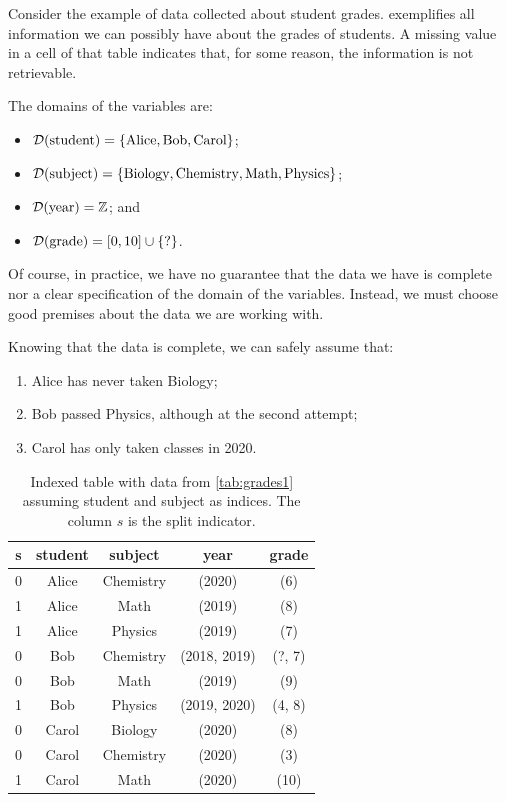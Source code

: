 Consider the example of data collected about student grades.  
exemplifies all information we can possibly have about the grades of students.  A missing
value in a cell of that table indicates that, for some reason, the information is not
retrievable.

The domains of the variables are:
\begin{itemize}
  \itemsep0em
  \item $\mathcal{D}\!\left(\text{student}\right) = \left\{\text{Alice}, \text{Bob}, \text{Carol}\right\}$;
  \item $\mathcal{D}\!\left(\text{subject}\right) = \left\{\text{Biology}, \text{Chemistry}, \text{Math},
    \text{Physics}\right\}$;
  \item $\mathcal{D}\!\left(\text{year}\right) = \mathbb{Z}$; and
  \item $\mathcal{D}\!\left(\text{grade}\right) = \left[0, 10\right] \cup \left\{\text{?}\right\}$.
\end{itemize}

Of course, in practice, we have no guarantee that the data we have is complete nor a
clear specification of the domain of the variables.  Instead, we must choose good
premises about the data we are working with.

Knowing that the data is complete, we can safely assume that:
\begin{enumerate}
  \itemsep0em
  \item Alice has never taken Biology;
  \item Bob passed Physics, although at the second attempt;
  \item Carol has only taken classes in 2020.
\end{enumerate}

\begin{table}
  \centering
  \begin{tabular}{ccccc}
    \toprule
    \textbf{s} & \textbf{student} & \textbf{subject} & \textbf{year} & \textbf{grade} \\
    \midrule
    0 & Alice & Chemistry & (2020) & (6) \\
    1 & Alice & Math & (2019) & (8) \\
    1 & Alice & Physics & (2019) & (7) \\
    0 & Bob & Chemistry & (2018, 2019) & (?, 7) \\
    0 & Bob & Math & (2019) & (9) \\
    1 & Bob & Physics & (2019, 2020) & (4, 8) \\
    0 & Carol & Biology & (2020) & (8) \\
    0 & Carol & Chemistry & (2020) & (3) \\
    1 & Carol & Math & (2020) & (10) \\
    \bottomrule
  \end{tabular}
  \caption{
  Indexed table with data from \cref{tab:grades1} assuming student and
  subject as indices.  The column $s$ is the split indicator.
  }
  \label{tab:grades2}
\end{table}

